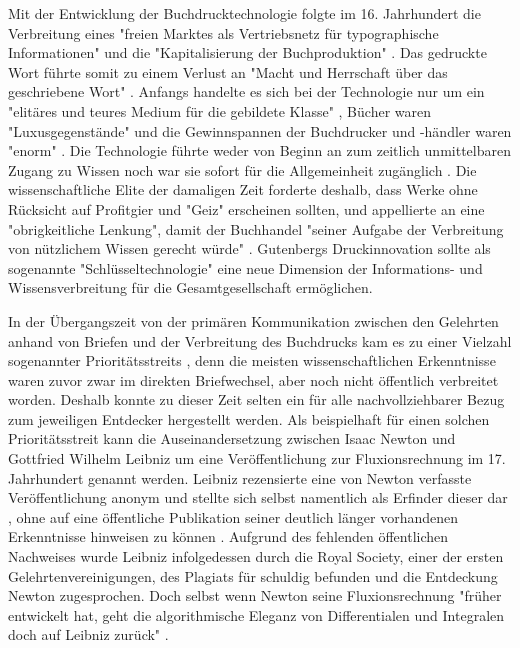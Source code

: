 Mit der Entwicklung der Buchdrucktechnologie folgte im 16. Jahrhundert die Verbreitung eines "freien Marktes als Vertriebsnetz für typographische Informationen" \cite[:27]{Giesecke_1991} und die "Kapitalisierung der Buchproduktion" \cite[:40]{Steiner_1998}. Das gedruckte Wort führte somit zu einem Verlust an "Macht und Herrschaft über das geschriebene Wort" \cite[:16]{Wunderlich_2008}. Anfangs handelte es sich bei der Technologie nur um ein "elitäres und teures Medium für die gebildete Klasse" \cite[:14]{Hartmann_2008}, Bücher waren "Luxusgegenstände" und die Gewinnspannen der Buchdrucker und -händler waren "enorm" \cite[:27]{Stober_2014}. Die Technologie führte weder von Beginn an zum zeitlich unmittelbaren Zugang zu Wissen noch war sie sofort für die Allgemeinheit zugänglich \cite{Hartmann_2008}. Die wissenschaftliche Elite der damaligen Zeit forderte deshalb, dass Werke ohne Rücksicht auf Profitgier und "Geiz" \cite{Luther_1876} erscheinen sollten, und appellierte an eine "obrigkeitliche Lenkung", damit der Buchhandel "seiner Aufgabe der Verbreitung von nützlichem Wissen gerecht würde" \cite[:102]{Wittmann_1999}. Gutenbergs Druckinnovation sollte als sogenannte "Schlüsseltechnologie" \cite[:189]{Jaeger_1993} eine neue Dimension der Informations- und Wissensverbreitung für die Gesamtgesellschaft ermöglichen.

In der Übergangszeit von der primären Kommunikation zwischen den Gelehrten anhand von Briefen und der Verbreitung des Buchdrucks kam es zu einer Vielzahl sogenannter Prioritätsstreits \cite{Schirmbacher_2009}, denn die meisten wissenschaftlichen Erkenntnisse waren zuvor zwar im direkten Briefwechsel, aber noch nicht öffentlich verbreitet worden. Deshalb konnte zu dieser Zeit selten ein für alle nachvollziehbarer Bezug zum jeweiligen Entdecker hergestellt werden. Als beispielhaft für einen solchen Prioritätsstreit kann die Auseinandersetzung zwischen Isaac Newton und Gottfried Wilhelm Leibniz um eine Veröffentlichung zur Fluxionsrechnung im 17. Jahrhundert genannt werden. Leibniz rezensierte eine von Newton verfasste Veröffentlichung anonym und stellte sich selbst namentlich als Erfinder dieser dar \cite{Padova_2013} \cite[:252]{Rommel_2011}, ohne auf eine öffentliche Publikation seiner deutlich länger vorhandenen Erkenntnisse hinweisen zu können \cite{Schirmbacher_2009}. Aufgrund des fehlenden öffentlichen Nachweises wurde Leibniz infolgedessen durch die Royal Society, einer der ersten Gelehrtenvereinigungen, des Plagiats für schuldig befunden und die Entdeckung Newton zugesprochen. Doch selbst wenn Newton seine Fluxionsrechnung "früher entwickelt hat, geht die algorithmische Eleganz von Differentialen und Integralen doch auf Leibniz zurück" \cite{Kittler_1996}.

